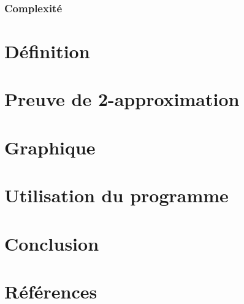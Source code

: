 \documentclass[a4paper,11pt]{article}
\begin{document}
\subsubsection*{Complexité}

\section{Définition} %

\section{Preuve de 2-approximation} %

\section{Graphique} %

\section{Utilisation du programme} %

\section{Conclusion} %

\section{Références}
\end{document}

